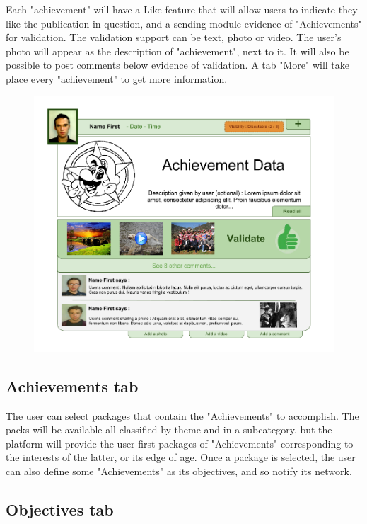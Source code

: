 \documentclass{life-fr}
\begin{document}
Each "achievement" will have a Like feature that will allow users to indicate they like the publication in question, and a sending module evidence of "Achievements" for validation. The validation support can be text, photo or video. The user's photo will appear as the description of "achievement", next to it. It will also be possible to post comments below evidence of validation. A tab "More" will take place every "achievement" to get more information.\\

\begin{figure}[H]
  \begin{center}
    \includegraphics[width=15cm]{img/achievement.png}
  \end{center}
\end{figure}

\subsection{Achievements tab}

The user can select packages that contain the "Achievements" to accomplish. The packs will be available all classified by theme and in a subcategory, but the platform will provide the user first packages of "Achievements" corresponding to the interests of the latter, or its edge of age. Once a package is selected, the user can also define some "Achievements" as its objectives, and so notify its network.

\subsection{Objectives tab}
\end{document}
